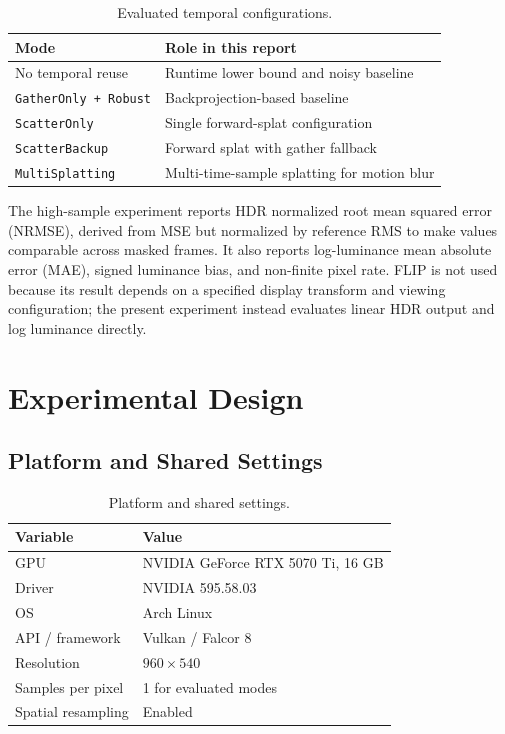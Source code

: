 \documentclass[10pt,twocolumn]{article}
\newcommand{\method}[1]{\texttt{#1}}
\begin{document}
\begin{table}[t]
\caption{Evaluated temporal configurations.}
\label{tab:modes}
\centering
\small
\begin{tabularx}{\columnwidth}{@{}lX@{}}
\toprule
Mode & Role in this report \\
\midrule
No temporal reuse & Runtime lower bound and noisy baseline \\
\method{GatherOnly + Robust} & Backprojection-based baseline \\
\method{ScatterOnly} & Single forward-splat configuration \\
\method{ScatterBackup} & Forward splat with gather fallback \\
\method{MultiSplatting} & Multi-time-sample splatting for motion blur \\
\bottomrule
\end{tabularx}
\end{table}

The high-sample experiment reports HDR normalized root mean squared error
(NRMSE), derived from MSE but normalized by reference RMS to make values
comparable across masked frames. It also reports log-luminance mean absolute
error (MAE), signed luminance bias, and non-finite pixel rate. FLIP is not used
because its result depends on a specified display transform and viewing
configuration; the present experiment instead evaluates linear HDR output and
log luminance directly.

\section{Experimental Design}

\subsection{Platform and Shared Settings}

\begin{table}[t]
\caption{Platform and shared settings.}
\label{tab:setup}
\centering
\small
\begin{tabularx}{\columnwidth}{@{}lX@{}}
\toprule
Variable & Value \\
\midrule
GPU & NVIDIA GeForce RTX 5070 Ti, 16 GB \\
Driver & NVIDIA 595.58.03 \\
OS & Arch Linux \\
API / framework & Vulkan / Falcor 8 \cite{falcor} \\
Resolution & $960{\times}540$ \\
Samples per pixel & 1 for evaluated modes \\
Spatial resampling & Enabled \\
\bottomrule
\end{tabularx}
\end{table}
\end{document}
